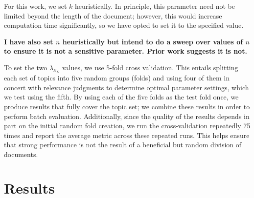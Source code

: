 \documentclass{report}
\begin{document}
For this work, we set $k$ heuristically. In principle, this parameter need not be limited beyond the length of the document; however, this would increase computation time significantly, so we have opted to set it to the specified value.

\textbf{I have also set $n$ heuristically but intend to do a sweep over values of $n$ to ensure it is not a sensitive parameter. Prior work suggests it is not.}

To set the two $\lambda_{\mathcal{E}_D}$ values, we use 5-fold cross validation. This entails splitting each set of topics into five random groups (folds) and using four of them in concert with relevance judgments to determine optimal parameter settings, which we test using the fifth. By using each of the five folds as the test fold once, we produce results that fully cover the topic set; we combine these results in order to perform batch evaluation. Additionally, since the quality of the results depends in part on the initial random fold creation, we run the cross-validation repeatedly 75 times and report the average metric across these repeated runs. This helps ensure that strong performance is not the result of a beneficial but random division of documents.

\section{Results}\label{section.results}
\end{document}
